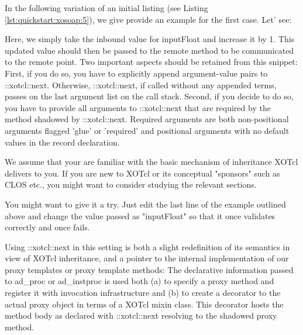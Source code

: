 In the following variation of an initial listing (see Listing \ref{lst:quickstart:xosoap:5}), we give provide an 
example for the first case. Let' see:



Here, we simply take the inbound value for inputFloat and increase it by 1. This updated value should 
then be passed to the remote method to be communicated to the remote point. Two important aspects 
should be retained from this snippet: First, if you do so, you have to explicitly append argument-value 
pairs to ::xotcl::next. Otherwise, ::xotcl::next, if called without any appended terms, passes on the last 
argument list on the call stack. Second, if you decide to do so, you have to provide all arguments 
to ::xotcl::next that are required by the method shadowed by ::xotcl::next. Required arguments are both 
non-positional arguments flagged 'glue' or 'required' and positional arguments with no default values in 
the record declaration.


\begin{hints}
\item We assume that your are familiar with the basic mechanism of inheritance XOTcl delivers to you. If 
you are new to XOTcl or its conceptual "sponsors" such as CLOS etc., you might want to consider 
studying the relevant sections.
\item You might want to give it a try. Just edit the last line of the example outlined above and change the 
value passed as "inputFloat" so that it once validates correctly and once fails.
\end{hints}

Using ::xotcl::next in this setting is both a slight redefinition of its semantics in view of XOTcl inheritance, 
and a pointer to the internal implementation of our proxy templates or proxy template methods: The 
declarative information passed to ad\_proc or ad\_instproc is used both (a) to specify a proxy method 
and register it with invocation infrastructure and (b) to create a decorator to the actual proxy object in 
terms of a XOTcl mixin class. This decorator hosts the method body as declared with ::xotcl::next 
resolving to the shadowed proxy method.

